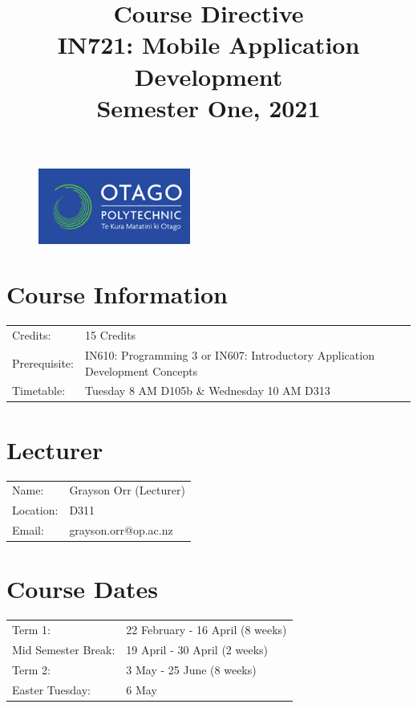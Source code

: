 \documentclass{article}
\author{}
\begin{document}
 

\begin{figure}
	\includegraphics[width=50mm]{./img/logo.png}
\end{figure} 

\title{Course Directive\\IN721: Mobile Application Development\\Semester One, 2021}
\date{}
\maketitle

\section*{Course Information}
\begin{tabular}{ll}
	Credits:                      & 15 Credits                                                                   \\
	Prerequisite:                 & IN610: Programming 3 or IN607: Introductory Application Development Concepts \\
	Timetable:  & Tuesday 8 AM D105b \& Wednesday 10 AM D313                                                         \\
\end{tabular}

\section*{Lecturer}
\begin{tabular}{ll}
	Name:     & Grayson Orr (Lecturer) \\
	Location: & D311                   \\
	Email:    & grayson.orr@op.ac.nz   \\
\end{tabular}

\section*{Course Dates}
\begin{tabular}{ll}
	Term 1:             & 22 February - 16 April (8 weeks) \\
	Mid Semester Break: & 19 April - 30 April (2 weeks)    \\
	Term 2:             & 3 May - 25 June (8 weeks)        \\     
	Easter Tuesday:     & 6 May                            \\                 
\end{tabular}
\end{document}
